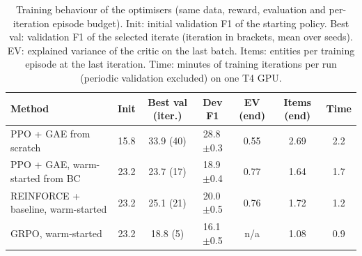 \begin{table}[t]
\centering
\footnotesize
\caption{Training behaviour of the optimisers (same data, reward, evaluation and per-iteration episode budget). Init: initial validation F1 of the starting policy. Best val: validation F1 of the selected iterate (iteration in brackets, mean over seeds). EV: explained variance of the critic on the last batch. Items: entities per training episode at the last iteration. Time: minutes of training iterations per run (periodic validation excluded) on one T4 GPU.}
\label{tab:optim}
\setlength{\tabcolsep}{4pt}
\begin{tabular}{@{}lcccccc@{}}
\toprule
Method & Init & Best val (iter.) & Dev F1 & EV (end) & Items (end) & Time \\
\midrule
PPO + GAE from scratch & 15.8 & 33.9 (40) & 28.8\,{\scriptsize$\pm$0.3} & 0.55 & 2.69 & 2.2 \\
PPO + GAE, warm-started from BC & 23.2 & 23.7 (17) & 18.9\,{\scriptsize$\pm$0.4} & 0.77 & 1.64 & 1.7 \\
REINFORCE + baseline, warm-started & 23.2 & 25.1 (21) & 20.0\,{\scriptsize$\pm$0.5} & 0.76 & 1.72 & 1.2 \\
GRPO, warm-started & 23.2 & 18.8 (5) & 16.1\,{\scriptsize$\pm$0.5} & n/a & 1.08 & 0.9 \\
\bottomrule
\end{tabular}
\end{table}
